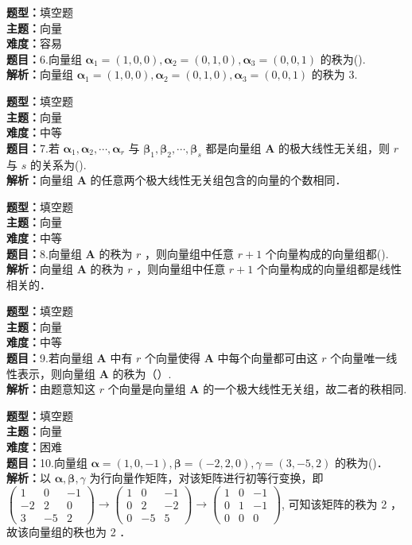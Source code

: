 \documentclass{ctexart}
\newenvironment{question}[5]{%
	\noindent\textbf{题型：}#1\\
	\textbf{主题：}#2\\
	\textbf{难度：}#3\\
	\textbf{题目：}#4\\
	\textbf{解析：}#5\\
	\vspace{1em}
}{}
\begin{document}
	\begin{question}
		{填空题}
		{向量}
		{容易}
		{6.向量组 \(\boldsymbol{\alpha}_1=(1,0,0), \boldsymbol{\alpha}_2=(0,1,0), \boldsymbol{\alpha}_3=(0,0,1)\) 的秩为(\qquad). }
		{向量组 \(\boldsymbol{\alpha}_1=(1,0,0), \boldsymbol{\alpha}_2=(0,1,0), \boldsymbol{\alpha}_3=(0,0,1)\) 的秩为 3.}
	\end{question}
	
	\begin{question}
		{填空题}
		{向量}
		{中等}
		{7.若 \(\boldsymbol{\alpha}_1, \boldsymbol{\alpha}_2, \cdots, \boldsymbol{\alpha}_{r}\) 与 \(\boldsymbol{\beta}_1, \boldsymbol{\beta}_2, \cdots, \boldsymbol{\beta}_s\) 都是向量组 \(\mathbf{A}\) 的极大线性无关组，则 \(r\) 与 \(s\) 的关系为(\qquad). }
		{向量组 \(\mathbf{A}\) 的任意两个极大线性无关组包含的向量的个数相同．}
	\end{question}
	
	\begin{question}
		{填空题}
		{向量}
		{中等}
		{8.向量组 \(\mathbf{A}\) 的秩为 \(r\) ，则向量组中任意 \(r+1\) 个向量构成的向量组都(\qquad). }
		{向量组 \(\mathbf{A}\) 的秩为 \(r\) ，则向量组中任意 \(r+1\) 个向量构成的向量组都是线性相关的．}
	\end{question}
	
	\begin{question}
		{填空题}
		{向量}
		{中等}
		{9.若向量组 \(\mathbf{A}\) 中有 \(r\) 个向量使得 \(\mathbf{A}\) 中每个向量都可由这 \(r\) 个向量唯一线性表示，则向量组 \(\mathbf{A}\) 的秩为（）. }
		{由题意知这 \(r\) 个向量是向量组 \(\mathbf{A}\) 的一个极大线性无关组，故二者的秩相同. }
	\end{question}
	
	\begin{question}
		{填空题}
		{向量}
		{困难}
		{10.向量组 \(\boldsymbol{\alpha}=(1,0,-1), \boldsymbol{\beta}=(-2,2,0), \gamma=(3,-5,2)\) 的秩为(\qquad)．}
		{以 \(\boldsymbol{\alpha}, \boldsymbol{\beta}, \gamma\) 为行向量作矩阵，对该矩阵进行初等行变换，即 \(\left(\begin{array}{ccc}1 & 0 & -1 \\ -2 & 2 & 0 \\ 3 & -5 & 2\end{array}\right) \rightarrow\left(\begin{array}{ccc}1 & 0 & -1 \\ 0 & 2 & -2 \\ 0 & -5 & 5\end{array}\right) \rightarrow\left(\begin{array}{ccc}1 & 0 & -1 \\ 0 & 1 & -1 \\ 0 & 0 & 0\end{array}\right)\), 可知该矩阵的秩为 2 ，故该向量组的秩也为 2 ．}
	\end{question}
	
\end{document}
